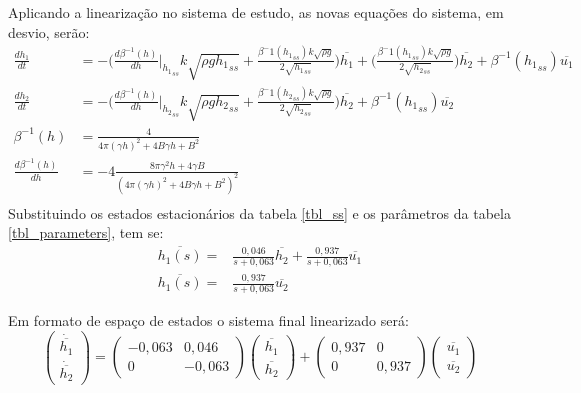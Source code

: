 Aplicando a linearização no sistema de estudo, as novas equações do sistema, em desvio, serão:
\begin{align}
\frac{dh_1}{dt} &= -\big(\frac{d\beta^{-1}(h)}{dh}\bigg|_{{h_1}_{ss}} k\sqrt{\rho g {h_1}_{ss}} + \frac{\beta^-1({h_1}_{ss}) k\sqrt{\rho g}}{2\sqrt{{h_1}_{ss}}}\big)\overline{h_1} + \big(\frac{\beta^-1({h_1}_{ss}) k\sqrt{\rho g}}{2\sqrt{{h_2}_{ss}}}\big)\overline{h_2} +  \beta^{-1}({h_1}_{ss})\overline{u_1} \\
\frac{dh_2}{dt} &= -\big(\frac{d\beta^{-1}(h)}{dh}\bigg|_{{h_2}_{ss}} k\sqrt{\rho g {h_2}_{ss}} + \frac{\beta^-1({h_2}_{ss}) k\sqrt{\rho g}}{2\sqrt{{h_2}_{ss}}}\big)\overline{h_2} + \beta^{-1}({h_1}_{ss})\overline{u_2} \\
\beta^{-1}(h) &= \frac{4}{4\pi(\gamma h)^2 + 4B\gamma h + B^2} \\
\frac{d\beta^{-1}(h)}{dh} &= -4 \frac{8 \pi \gamma^2 h + 4 \gamma B}{(4\pi(\gamma h)^2 + 4B\gamma h + B^2)^2} \\
\end{align}
Substituindo os estados estacionários da tabela \ref{tbl_ss} e os parâmetros da tabela \ref{tbl_parameters}, tem se:
\begin{align}
\overline{h_1(s)} = & \frac{0,046}{s + 0,063}\overline{h_2} + \frac{0,937}{s + 0,063}\overline{u_1} \\
\overline{h_1(s)} = & \frac{0,937}{s + 0,063}\overline{u_2}
\end{align}

Em formato de espaço de estados o sistema final linearizado será:
\begin{equation}
\begin{pmatrix} \dot{\overline{h_1}} \\ \dot{\overline{h_2}} \end{pmatrix} = \begin{pmatrix} -0,063 & 0,046 \\ 0 & -0,063 \end{pmatrix} \begin{pmatrix} \overline{h_1} \\ \overline{h_2} \end{pmatrix} + \begin{pmatrix} 0,937 & 0 \\ 0 & 0,937 \end{pmatrix} \begin{pmatrix} \overline{u_1} \\ \overline{u_2} \end{pmatrix}
\label{espaco_estados}
\end{equation}

